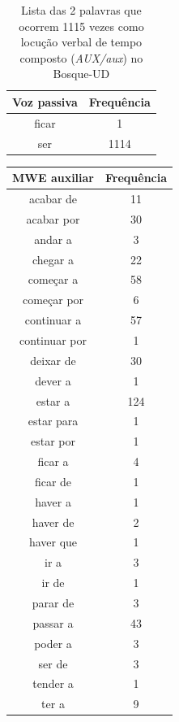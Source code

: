 \documentclass[output=paper,colorlinks,citecolor=brown]{langscibook}
\begin{document}
	\begin{table}[]
		\centering
		\begin{tabular}{|c|c|}
			\hline
			\textbf{Voz passiva} & \textbf{Frequência} \\\hline
			ficar & 1\\\hline
			ser & 1114\\\hline
		\end{tabular}
		\caption{Lista das 2 palavras que ocorrem 1115 vezes como locução verbal de tempo composto (\emph{AUX/aux}) no Bosque-UD}
		\label{tab:loctempocomposto}
	\end{table}

	\begin{table}[]
		\parbox{.45\linewidth}{
			\centering
			\begin{tabular}{|c|c|}
				\hline
				\textbf{MWE auxiliar} & \textbf{Frequência} \\\hline
				acabar de & 11\\\hline
				acabar por & 30\\\hline
				andar a & 3\\\hline
				chegar a & 22\\\hline
				começar a & 58\\\hline
				começar por & 6\\\hline
				continuar a & 57\\\hline
				continuar por & 1\\\hline
				deixar de & 30\\\hline
				dever a & 1\\\hline
				estar a & 124\\\hline
				estar para & 1\\\hline
				estar por & 1\\\hline
				ficar a & 4\\\hline
				ficar de & 1\\\hline
				haver a & 1\\\hline
				haver de & 2\\\hline
				haver que & 1\\\hline
				ir a & 3\\\hline
				ir de & 1\\\hline
				parar de & 3\\\hline
				passar a & 43\\\hline
				poder a & 3\\\hline
				ser de & 3\\\hline
				tender a & 1\\\hline
				ter a & 9\\\hline

\end{tabular}}
\end{table}
\end{document}

